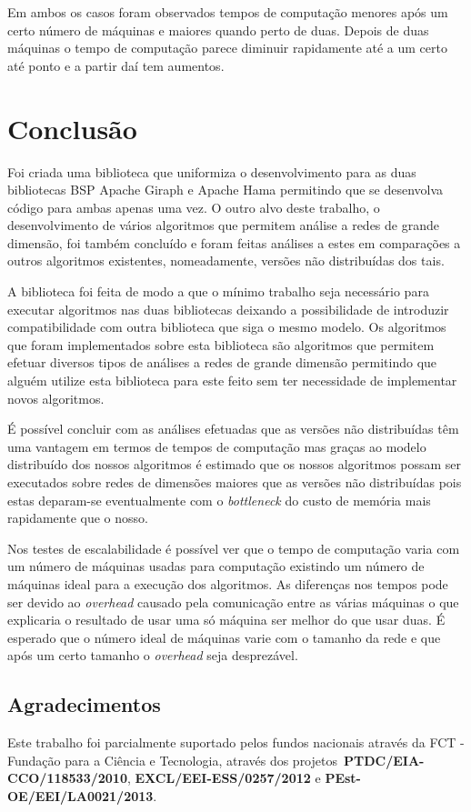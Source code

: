 Em ambos os casos foram observados tempos de computação menores após um certo 
número de máquinas e maiores quando perto de duas. Depois de duas máquinas o 
tempo de computação parece diminuir rapidamente até a um certo até ponto e a 
partir daí tem aumentos.

\chapter{Conclusão}
Foi criada uma biblioteca que uniformiza o desenvolvimento para as duas 
bibliotecas BSP Apache Giraph e Apache Hama permitindo que se desenvolva código 
para ambas apenas uma vez. O outro alvo deste trabalho, o desenvolvimento de 
vários algoritmos que permitem análise a redes de grande dimensão, foi também 
concluído e foram feitas análises a estes em comparações a outros algoritmos 
existentes, nomeadamente, versões não distribuídas dos tais.

A biblioteca foi feita de modo a que o mínimo trabalho seja necessário para 
executar algoritmos nas duas bibliotecas deixando a possibilidade de introduzir 
compatibilidade com outra biblioteca que siga o mesmo modelo. Os algoritmos que 
foram implementados sobre esta biblioteca são algoritmos que permitem efetuar 
diversos tipos de análises a redes de grande dimensão permitindo que alguém 
utilize esta biblioteca para este feito sem ter necessidade de implementar novos 
algoritmos.

É possível concluir com as análises efetuadas que as versões não distribuídas 
têm uma vantagem em termos de tempos de computação mas graças ao modelo 
distribuído dos nossos algoritmos é estimado que os nossos algoritmos possam ser 
executados sobre redes de dimensões maiores que as versões não distribuídas pois 
estas deparam-se eventualmente com o \textit{bottleneck} do custo de memória 
mais rapidamente que o nosso.

Nos testes de escalabilidade é possível ver que o tempo de computação 
varia com um número de máquinas usadas para computação existindo um número de 
máquinas ideal para a execução dos algoritmos. As diferenças nos tempos pode ser 
devido ao \textit{overhead} causado pela comunicação entre as várias máquinas o 
que explicaria o resultado de usar uma só máquina ser melhor do que usar duas. É 
esperado que o número ideal de máquinas varie com o tamanho da rede e que após 
um certo tamanho o \textsl{overhead} seja desprezável.

\section{Agradecimentos}
Este trabalho foi parcialmente suportado pelos fundos nacionais através da FCT - Fundação para a Ciência e Tecnologia, através dos projetos~\textbf{PTDC/EIA-CCO/118533/2010}, \textbf{EXCL/EEI-ESS/0257/2012} e \textbf{PEst-OE/EEI/LA0021/2013}.